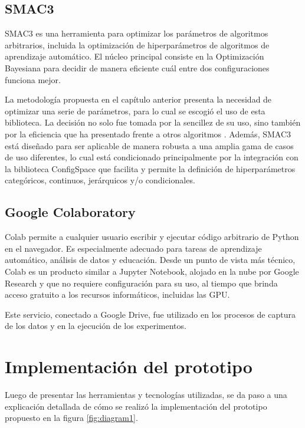 \subsection{SMAC3}

SMAC3 \cite{smac} es una herramienta para optimizar los parámetros de algoritmos arbitrarios, incluida la optimización de hiperparámetros de algoritmos de aprendizaje automático. El núcleo principal consiste en la Optimización Bayesiana para decidir de manera eficiente cuál entre dos configuraciones funciona mejor. 

La metodología propuesta en el capítulo anterior presenta la necesidad de optimizar una serie de parámetros, para lo cual se escogió el uso de esta biblioteca. La decisión no solo fue tomada por la sencillez de su uso, sino también por la eficiencia que ha presentado frente a otros algoritmos \cite{lindauer2022smac3}. Además, SMAC3 está diseñado para ser aplicable de manera robusta a una amplia gama de casos de uso diferentes, lo cual está condicionado principalmente por la integración con la biblioteca ConfigSpace \cite{configspace} que facilita y permite la definición de hiperparámetros categóricos, continuos, jerárquicos y/o condicionales.

\subsection{Google Colaboratory}

Colab \cite{colab} permite a cualquier usuario escribir y ejecutar código arbitrario de Python en el navegador. Es especialmente adecuado para tareas de aprendizaje automático, análisis de datos y educación. Desde un punto de vista más técnico, Colab es un producto similar a Jupyter Notebook, alojado en la nube por Google Research y que no requiere configuración para su uso, al tiempo que brinda acceso gratuito a los recursos informáticos, incluidas las GPU.

Este servicio, conectado a Google Drive, fue utilizado en los procesos de captura de los datos y en la ejecución de los experimentos.

\section{Implementación del prototipo}

Luego de presentar las herramientas y tecnologías utilizadas, se da paso a una explicación detallada de cómo se realizó la implementación del prototipo propuesto en la figura \ref{fig:diagram1}.

